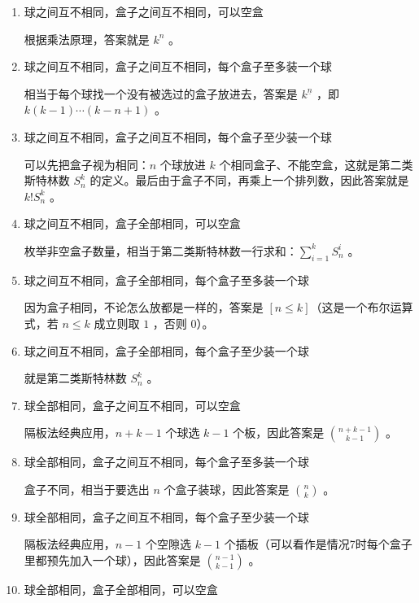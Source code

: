 \documentclass{article}
\begin{document}
\begin{enumerate}
    \item 球之间互不相同，盒子之间互不相同，可以空盒

   根据乘法原理，答案就是 $k^n$ 。

    \item 球之间互不相同，盒子之间互不相同，每个盒子至多装一个球

   相当于每个球找一个没有被选过的盒子放进去，答案是 $k^{\underline{n}}$ ，即 $k(k-1)\cdots(k-n+1)$ 。

    \item 球之间互不相同，盒子之间互不相同，每个盒子至少装一个球

   可以先把盒子视为相同：$n$ 个球放进 $k$ 个相同盒子、不能空盒，这就是第二类斯特林数 $S^k_n$ 的定义。最后由于盒子不同，再乘上一个排列数，因此答案就是 $k!S^k_n$ 。

    \item 球之间互不相同，盒子全部相同，可以空盒

   枚举非空盒子数量，相当于第二类斯特林数一行求和：$\sum_{i=1}^{k}S^i_n$ 。

    \item 球之间互不相同，盒子全部相同，每个盒子至多装一个球

   因为盒子相同，不论怎么放都是一样的，答案是 $[n\leq k]$（这是一个布尔运算式，若 $n\leq k$ 成立则取 $1$ ，否则 $0$）。

    \item 球之间互不相同，盒子全部相同，每个盒子至少装一个球

   就是第二类斯特林数 $S_n^k$ 。

    \item 球全部相同，盒子之间互不相同，可以空盒

   隔板法经典应用，$n+k-1$ 个球选 $k-1$ 个板，因此答案是 $\binom{n+k-1}{k-1}$ 。

    \item 球全部相同，盒子之间互不相同，每个盒子至多装一个球

   盒子不同，相当于要选出 $n$ 个盒子装球，因此答案是 $\binom{n}{k}$ 。

    \item 球全部相同，盒子之间互不相同，每个盒子至少装一个球

   隔板法经典应用，$n-1$ 个空隙选 $k-1$ 个插板（可以看作是情况7时每个盒子里都预先加入一个球），因此答案是 $\binom{n-1}{k-1}$ 。

    \item 球全部相同，盒子全部相同，可以空盒


\end{enumerate}
\end{document}
